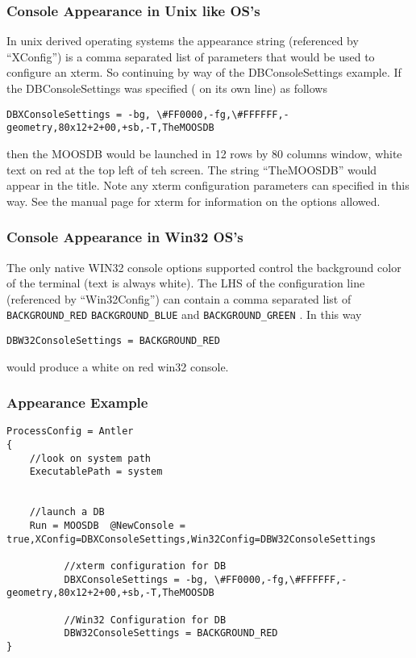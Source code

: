 \documentclass[a4paper,10pt]{article}
\newcommand{\Code}[1]{\texttt{#1} }
\newcommand{\code}[1]{\Code{#1} }
\begin{document}
\subsubsection{Console Appearance in Unix like OS's}

In unix derived operating systems the appearance string (referenced by ``XConfig'') is a comma separated list of parameters that would be used to configure an xterm. So continuing by way of the DBConsoleSettings example. If the DBConsoleSettings was specified ( on its own line) as follows
\begin{lstlisting}
DBXConsoleSettings = -bg, \#FF0000,-fg,\#FFFFFF,-geometry,80x12+2+00,+sb,-T,TheMOOSDB
\end{lstlisting}
then the MOOSDB would be  launched in 12 rows by 80 columns window, white text on red at the top left of teh screen. The string ``TheMOOSDB'' would appear in the title. Note any xterm configuration parameters can specified in this way. See the manual page for xterm for information on the options allowed.

\subsubsection{Console Appearance in Win32 OS's}
The only native WIN32 console options supported control the background color of the terminal (text is always white). The LHS of the configuration line (referenced by ``Win32Config'')  can contain a comma separated list of \code{BACKGROUND\_RED} \code{BACKGROUND\_BLUE}  and \code{BACKGROUND\_GREEN}. In this way
\begin{lstlisting}
DBW32ConsoleSettings = BACKGROUND_RED
\end{lstlisting}
would produce a white on red win32 console.

\subsubsection{Appearance Example}

\begin{lstlisting}
ProcessConfig = Antler
{
	//look on system path
	ExecutablePath = system


	//launch a DB
	Run = MOOSDB  @NewConsole = true,XConfig=DBXConsoleSettings,Win32Config=DBW32ConsoleSettings
	
          //xterm configuration for DB
          DBXConsoleSettings = -bg, \#FF0000,-fg,\#FFFFFF,-geometry,80x12+2+00,+sb,-T,TheMOOSDB
         
          //Win32 Configuration for DB
          DBW32ConsoleSettings = BACKGROUND_RED	
}
\end{lstlisting}
\end{document}
